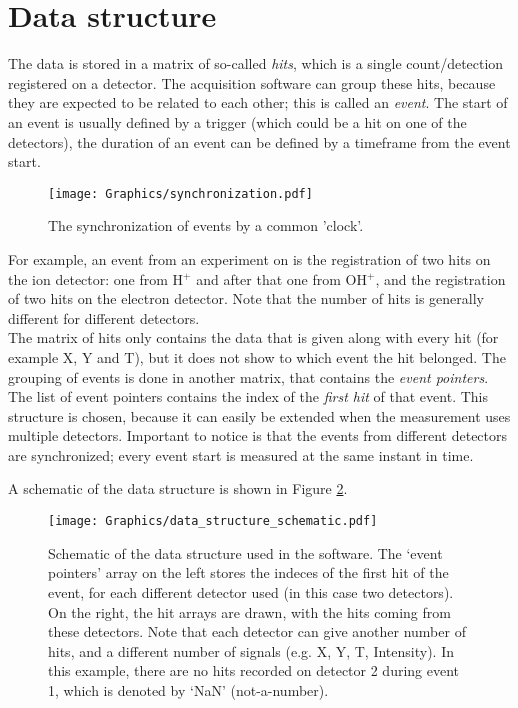 \section{Data structure}

The data is stored in a matrix of so-called \emph{hits}, which is a single count/detection registered on a detector. The acquisition software can group these hits, because they are expected to be related to each other; this is called an \emph{event}. The start of an event is usually defined by a trigger (which could be a hit on one of the detectors), the duration of an event can be defined by a timeframe from the event start.

\begin{figure}[h]
   \centering
    \centerline{\texttt{[image: Graphics/synchronization.pdf]}}
\caption{The synchronization of events by a common 'clock'.}
\label{event_synchronization}
\end{figure}

For example, an event from an experiment on  is the registration of two hits on the ion detector: one from H$^+$ and after that one from OH$^+$, and the registration of two hits on the electron detector. Note that the number of hits is generally different for different detectors.
\\
The matrix of hits only contains the data that is given along with every hit (for example X, Y and T), but it does not show to which event the hit belonged. The grouping of events is done in another matrix, that contains the \emph{event pointers}. The list of event pointers contains the index of the \emph{first hit} of that event. 
This structure is chosen, because it can easily be extended when the measurement uses multiple detectors.
Important to notice is that the events from different detectors are synchronized; every event start is measured at the same instant in time. 

A schematic of the data structure is shown in Figure \ref{Data_structure_schematic_intro}.

\begin{figure}[h]
   \centering
    \centerline{\texttt{[image: Graphics/data\_structure\_schematic.pdf]}}
\caption{Schematic of the data structure used in the software. The `event pointers' array on the left stores the indeces of the first hit of the event, for each different detector used (in this case two detectors). On the right, the hit arrays are drawn, with the hits coming from these detectors. Note that each detector can give another number of hits, and a different number of signals (e.g. X, Y, T, Intensity). In this example, there are no hits recorded on detector 2 during event 1, which is denoted by `NaN' (not-a-number).}
\label{Data_structure_schematic_intro}
\end{figure}


